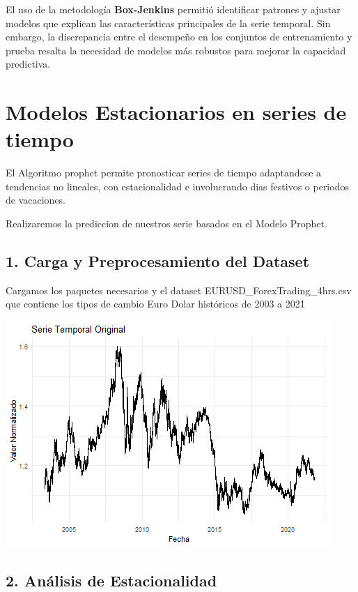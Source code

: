 \documentclass[
]{book}
\begin{document}
El uso de la metodología \textbf{Box-Jenkins} permitió identificar patrones y ajustar modelos que explican las características principales de la serie temporal. Sin embargo, la discrepancia entre el desempeño en los conjuntos de entrenamiento y prueba resalta la necesidad de modelos más robustos para mejorar la capacidad predictiva.

\chapter{Modelos Estacionarios en series de tiempo}\label{modelos-estacionarios-en-series-de-tiempo}

El Algoritmo prophet permite pronosticar series de tiempo adaptandose a tendencias no lineales, con estacionalidad e involucrando dias festivos o periodos de vacaciones.

Realizaremos la prediccion de nuestros serie basados en el Modelo Prophet.

\section{1. Carga y Preprocesamiento del Dataset}\label{carga-y-preprocesamiento-del-dataset}

Cargamos los paquetes necesarios y el dataset EURUSD\_ForexTrading\_4hrs.csv que contiene los tipos de cambio Euro Dolar históricos de 2003 a 2021

\includegraphics{bookdown_time_series_files/figure-latex/unnamed-chunk-12-1.png}

\section{2. Análisis de Estacionalidad}\label{anuxe1lisis-de-estacionalidad-1}
\end{document}
